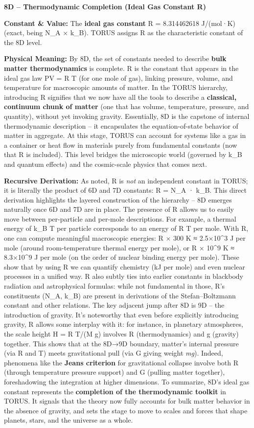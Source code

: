 \documentclass[]{article}
\begin{document}
\textbf{8D -- Thermodynamic Completion (Ideal Gas Constant R)}

\textbf{Constant \& Value:} The \textbf{ideal gas constant} R =
8.314462618 J/(mol·K) (exact, being N\_A × k\_B)​. TORUS assigns R as
the characteristic constant of the 8D level.

\textbf{Physical Meaning:} By 8D, the set of constants needed to
describe \textbf{bulk matter thermodynamics} is complete. R is the
constant that appears in the ideal gas law PV = R T (for one mole of
gas), linking pressure, volume, and temperature for macroscopic amounts
of matter​. In the TORUS hierarchy, introducing R signifies that we now
have all the tools to describe a \textbf{classical, continuum chunk of
matter} (one that has volume, temperature, pressure, and quantity),
without yet invoking gravity. Essentially, 8D is the capstone of
internal thermodynamic description -- it encapsulates the
equation-of-state behavior of matter in aggregate. At this stage, TORUS
can account for systems like a gas in a container or heat flow in
materials purely from fundamental constants (now that R is included).
This level bridges the microscopic world (governed by k\_B and quantum
effects) and the cosmic-scale physics that comes next.

\textbf{Recursive Derivation:} As noted, R is \emph{not} an independent
constant in TORUS; it is literally the product of 6D and 7D constants: R
= N\_A · k\_B​. This direct derivation highlights the layered
construction of the hierarchy -- 8D emerges naturally once 6D and 7D are
in place. The presence of R allows us to easily move between
per-particle and per-mole descriptions. For example, a thermal energy of
k\_B T per particle corresponds to an energy of R T per mole. With R,
one can compute meaningful macroscopic energies: R × 300 K ≈ 2.5×10\^{}3
J per mole (around room-temperature thermal energy per mole), or R ×
10\^{}9 K ≈ 8.3×10\^{}9 J per mole (on the order of nuclear binding
energy per mole)​. These show that by using R we can quantify chemistry
(kJ per mole) and even nuclear processes in a unified way. R also subtly
ties into earlier constants in blackbody radiation and astrophysical
formulas: while not fundamental in those, R's constituents (N\_A, k\_B)
are present in derivations of the Stefan--Boltzmann constant and other
relations​. The key adjacent jump after 8D is 9D -- the introduction of
gravity. It's noteworthy that even before explicitly introducing
gravity, R allows some interplay with it: for instance, in planetary
atmospheres, the scale height H = R T/(M g) involves R (thermodynamics)
and g (gravity) together​. This shows that at the 8D→9D boundary,
matter's internal pressure (via R and T) meets gravitational pull (via G
giving weight \emph{mg}). Indeed, phenomena like the \textbf{Jeans
criterion} for gravitational collapse involve both R (through
temperature pressure support) and G (pulling matter together),
foreshadowing the integration at higher dimensions. To summarize, 8D's
ideal gas constant represents the \textbf{completion of the
thermodynamic toolkit} in TORUS. It signals that the theory now fully
accounts for bulk matter behavior in the absence of gravity, and sets
the stage to move to scales and forces that shape planets, stars, and
the universe as a whole.
\end{document}
